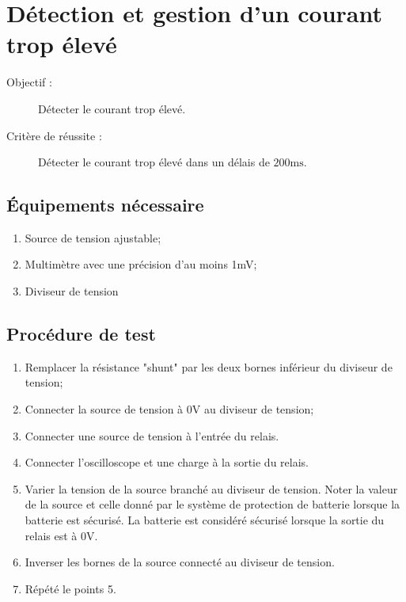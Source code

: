 
\section{Détection et gestion d'un courant trop élevé}

\begin{description}
	\item[Objectif :] Détecter le courant trop élevé.
	\item[Critère de réussite :] Détecter le courant trop élevé dans un délais de $200\text{ms}$.
\end{description}

\subsection*{Équipements nécessaire}
\begin{enumerate}
	\item Source de tension ajustable;
	\item Multimètre avec une précision d'au moins 1mV;
	\item Diviseur de tension
\end{enumerate}	

\subsection*{Procédure de test}
\begin{enumerate}
	\item Remplacer la résistance "shunt" par les deux bornes inférieur du diviseur de tension; 
	\item Connecter la source de tension à 0V au diviseur de tension;
	\item Connecter une source de tension à l'entrée du relais.
	\item Connecter l'oscilloscope et une charge à la sortie du relais.
	\item Varier la tension de la source branché au diviseur de tension. Noter la valeur de la source et celle donné par le système de protection de batterie lorsque la batterie est sécurisé. La batterie est considéré sécurisé lorsque la sortie du relais est à 0V.
	\item Inverser les bornes de la source connecté au diviseur de tension.
	\item Répété le points 5.
\end{enumerate}